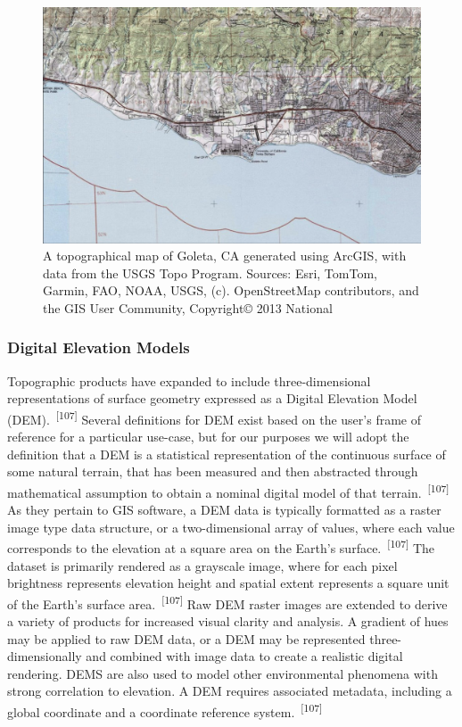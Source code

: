 \documentclass{article}
\begin{document}
\begin{figure}
    \centering
    \includegraphics[width=1.0\linewidth]{images/us-topo-goleta.png}
    \caption{A topographical map of Goleta, CA generated using ArcGIS, with data from the USGS Topo Program. Sources: Esri, TomTom, Garmin, FAO, NOAA, USGS, (c). OpenStreetMap contributors, and the GIS User Community, Copyright© 2013 National}
    \label{figure29}
\end{figure}


\subsubsection{Digital Elevation Models}

\par{Topographic products have expanded to include three-dimensional representations of surface geometry expressed as a Digital Elevation Model (DEM).~\textsuperscript{[107]} Several definitions for DEM exist based on the user's frame of reference for a particular use-case, but for our purposes we will adopt the definition that a DEM is a statistical representation of the continuous surface of some natural terrain, that has been measured and then abstracted through mathematical assumption to obtain a nominal digital model of that terrain.~\textsuperscript{[107]} As they pertain to GIS software, a DEM data is typically formatted as a raster image type data structure, or a two-dimensional array of values, where each value corresponds to the elevation at a square area on the Earth's surface.~\textsuperscript{[107]} The dataset is primarily rendered as a grayscale image, where for each pixel brightness represents elevation height and spatial extent represents a square unit of the Earth's surface area.~\textsuperscript{[107]} Raw DEM raster images are extended to derive a variety of products for increased visual clarity and analysis. A gradient of hues may be applied to raw DEM data, or a DEM may be represented three-dimensionally and combined with image data to create a realistic digital rendering. DEMS are also used to model other environmental phenomena with strong correlation to elevation. A DEM requires associated metadata, including a global coordinate and a coordinate reference system.~\textsuperscript{[107]} }
\end{document}
